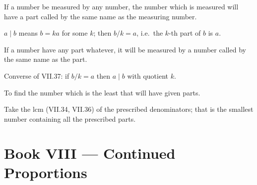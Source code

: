 \documentclass{rrxiv}
\begin{document}
\begin{claim}
\label{prop:VII.37}
If a number be measured by any number, the number which is measured
will have a part called by the same name as the measuring number.
\end{claim}
\begin{evidence}
\label{ev:VII.37}
$a \mid b$ means $b = ka$ for some $k$; then $b / k = a$, i.e.\ the
$k$-th part of $b$ is $a$.
\end{evidence}

\begin{claim}
\label{prop:VII.38}
If a number have any part whatever, it will be measured by a number
called by the same name as the part.
\end{claim}
\begin{evidence}
\label{ev:VII.38}
Converse of VII.37: if $b/k = a$ then $a \mid b$ with quotient $k$.
\end{evidence}

\begin{claim}
\label{prop:VII.39}
To find the number which is the least that will have given parts.
\end{claim}
\begin{evidence}
\label{ev:VII.39}
Take the lcm (VII.34, VII.36) of the prescribed denominators; that
is the smallest number containing all the prescribed parts.
\end{evidence}
%
%

\section{Book VIII --- Continued Proportions}
\label{sec:book-VIII}
\end{document}
